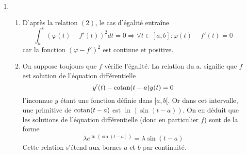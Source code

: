 \begin{enumerate}
\item \begin{enumerate}
 \item D'après la relation $(2)$, le cas d'égalité entraîne
\begin{displaymath}
 \int_u^v\left( \varphi(t) - f'(t)\right)^2dt =0
\Rightarrow
\forall t \in[a,b] : \varphi(t) - f'(t)=0
\end{displaymath}
car la fonction $(\varphi -f')^2$ est continue et positive.
\item On suppose toujours que $f$ vérifie l'égalité. La relation du a. signifie que $f$ est solution de l'équation différentielle
\begin{displaymath}
 y'(t)-\operatorname{cotan}(t-a)y(t)=0
\end{displaymath}
l'inconnue $y$ étant une fonction définie dans $]a,b[$. Or dans cet intervalle, une primitive de $\operatorname{cotan}(t-a)$ est $\ln(\sin(t-a))$. On en déduit que les solutions de l'équation différentielle (donc en particulier $f$) sont de la forme
\begin{displaymath}
 \lambda e^{\ln(\sin(t-a))} = \lambda \sin(t-a)
\end{displaymath}
Cette relation s'étend aux bornes $a$ et $b$ par continuité.
\end{enumerate}

\end{enumerate}

